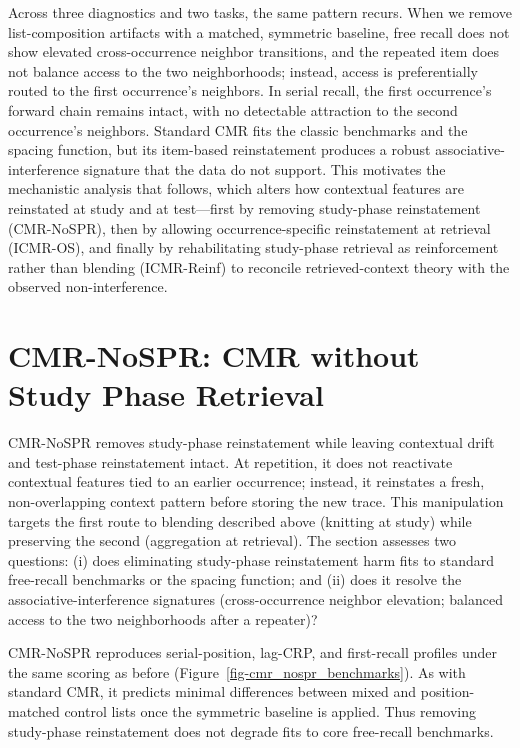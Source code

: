 \documentclass[
  letterpaper,
  11pt,
  english,
  singlespacing,
  headsepline]{MastersDoctoralThesis}
\begin{document}
Across three diagnostics and two tasks, the same pattern recurs. When we
remove list-composition artifacts with a matched, symmetric baseline,
free recall does not show elevated cross-occurrence neighbor
transitions, and the repeated item does not balance access to the two
neighborhoods; instead, access is preferentially routed to the first
occurrence's neighbors. In serial recall, the first occurrence's forward
chain remains intact, with no detectable attraction to the second
occurrence's neighbors. Standard CMR fits the classic benchmarks and the
spacing function, but its item-based reinstatement produces a robust
associative-interference signature that the data do not support. This
motivates the mechanistic analysis that follows, which alters how
contextual features are reinstated at study and at test---first by
removing study-phase reinstatement (CMR-NoSPR), then by allowing
occurrence-specific reinstatement at retrieval (ICMR-OS), and finally by
rehabilitating study-phase retrieval as reinforcement rather than
blending (ICMR-Reinf) to reconcile retrieved-context theory with the
observed non-interference.

\section{CMR-NoSPR: CMR without Study Phase
Retrieval}\label{cmr-nospr-cmr-without-study-phase-retrieval}

CMR-NoSPR removes study-phase reinstatement while leaving contextual
drift and test-phase reinstatement intact. At repetition, it does not
reactivate contextual features tied to an earlier occurrence; instead,
it reinstates a fresh, non-overlapping context pattern before storing
the new trace. This manipulation targets the first route to blending
described above (knitting at study) while preserving the second
(aggregation at retrieval). The section assesses two questions: (i) does
eliminating study-phase reinstatement harm fits to standard free-recall
benchmarks or the spacing function; and (ii) does it resolve the
associative-interference signatures (cross-occurrence neighbor
elevation; balanced access to the two neighborhoods after a repeater)?

CMR-NoSPR reproduces serial-position, lag-CRP, and first-recall profiles
under the same scoring as before
(Figure~\ref{fig-cmr_nospr_benchmarks}). As with standard CMR, it
predicts minimal differences between mixed and position-matched control
lists once the symmetric baseline is applied. Thus removing study-phase
reinstatement does not degrade fits to core free-recall benchmarks.
\end{document}
